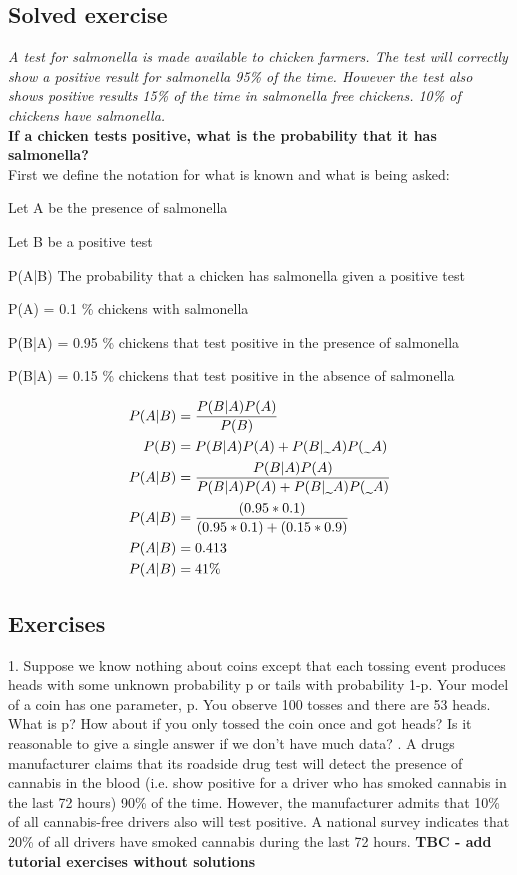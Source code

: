 \subsection{Solved exercise}
\textit{A test for salmonella is made available to chicken farmers. The test will correctly show a positive result for salmonella 95\% of the time. However the test also shows positive results 15\% of the time in salmonella free chickens. 10\% of chickens have salmonella.} \\
\textbf{If a chicken tests positive, what is the probability that it has salmonella?} \\
First we define the notation for what is known and what is being asked:\\
\setlength{\parindent}{10ex} \par
Let A be the presence of salmonella \par
Let B be a positive test \par
P(A|B) The probability that a chicken has salmonella given a positive test \par
P(A) = 0.1 \% chickens with salmonella \par
P(B|A) = 0.95 \% chickens that test positive in the presence of salmonella \par
P(B|\midtilde A) = 0.15 \% chickens that test positive in the absence of salmonella \par
\noindent
\begin{align*}
    P(A|B) & = \frac{P(B|A)P(A)}{P(B)} \\
    P(B) & = P(B|A)P(A) + P(B|\midtilde A)P(\midtilde A)\\
    P(A|B) & = \frac{P(B|A)P(A)}{P(B|A)P(A) + P(B|\midtilde A)P(\midtilde A)} \\
    P(A|B) & = \frac{(0.95*0.1)}{(0.95*0.1)+(0.15*0.9)} \\
    P(A|B) & = 0.413 \\
    P(A|B) & = 41\% \\
\end{align*}
\subsection{Exercises}
1. Suppose we know nothing about coins except that each tossing event produces heads with some unknown probability p or tails with probability 1-p. Your model of a coin has one parameter, p. You observe 100 tosses and there are 53 heads. What is p? How about if you only tossed the coin once and got heads? Is it reasonable to give a single answer if we don’t have much data? 
. A drugs manufacturer claims that its roadside drug test will detect the presence of cannabis in the blood (i.e. show positive for a driver who has smoked cannabis in the last 72 hours) 90\% of the time. However, the manufacturer admits that 10\% of all cannabis-free drivers also will test positive. A national survey indicates that 20\% of all drivers have smoked cannabis during the last 72 hours. \textbf{TBC - add tutorial exercises without solutions} \\

